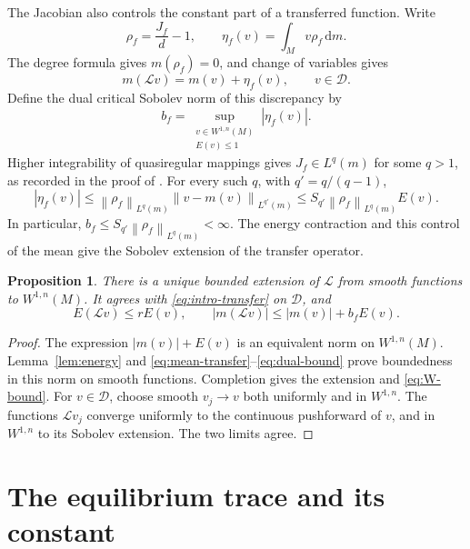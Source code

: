 \documentclass[10pt,a4paper]{amsart}
\newtheorem{proposition}[theorem]{Proposition}
\newcommand{\E}{\mathbb E}
\newcommand{\Lop}{\mathcal L}
\newcommand{\Dcal}{\mathcal D}
\newcommand{\norm}[1]{\left\lVert #1\right\rVert}
\newcommand{\dd}{\mathrm d}
\numberwithin{equation}{section}
\begin{document}
The Jacobian also controls the constant part of a transferred function. Write
\begin{equation}\label{eq:rho}
 \rho_f=\frac{J_f}{d}-1,
 \qquad \eta_f(v)=\int_Mv\rho_f\,\dd m.
\end{equation}
The degree formula gives $m(\rho_f)=0$, and change of variables gives
\begin{equation}\label{eq:mean-transfer}
 m(\Lop v)=m(v)+\eta_f(v),\qquad v\in\Dcal.
\end{equation}
Define the dual critical Sobolev norm of this discrepancy by
\begin{equation}\label{eq:def-b}
 b_f=\sup_{\substack{v\in W^{1,n}(M)\\E(v)\le1}}|\eta_f(v)|.
\end{equation}
Higher integrability of quasiregular mappings gives $J_f\in L^q(m)$ for some $q>1$, as recorded in the proof of \cite[Proposition 3.1]{OP14}. For every such $q$, with $q'=q/(q-1)$,
\begin{equation}\label{eq:dual-bound}
 |\eta_f(v)|
 \le\norm{\rho_f}_{L^q(m)}\norm{v-m(v)}_{L^{q'}(m)}
 \le S_{q'}\norm{\rho_f}_{L^q(m)}E(v).
\end{equation}
In particular, $b_f\le S_{q'}\norm{\rho_f}_{L^q(m)}<\infty$. The energy contraction and this control of the mean give the Sobolev extension of the transfer operator.

\begin{proposition}\label{prop:L-sobolev}
There is a unique bounded extension of $\Lop$ from smooth functions to $W^{1,n}(M)$. It agrees with \eqref{eq:intro-transfer} on $\Dcal$, and
\begin{equation}\label{eq:W-bound}
 E(\Lop v)\le rE(v),\qquad
 |m(\Lop v)|\le |m(v)|+b_fE(v).
\end{equation}
\end{proposition}

\begin{proof}
The expression $|m(v)|+E(v)$ is an equivalent norm on $W^{1,n}(M)$. Lemma~\ref{lem:energy} and \eqref{eq:mean-transfer}--\eqref{eq:dual-bound} prove boundedness in this norm on smooth functions. Completion gives the extension and \eqref{eq:W-bound}. For $v\in\Dcal$, choose smooth $v_j\to v$ both uniformly and in $W^{1,n}$. The functions $\Lop v_j$ converge uniformly to the continuous pushforward of $v$, and in $W^{1,n}$ to its Sobolev extension. The two limits agree.
\end{proof}

\section{The equilibrium trace and its constant}\label{sec:trace}
\end{document}

